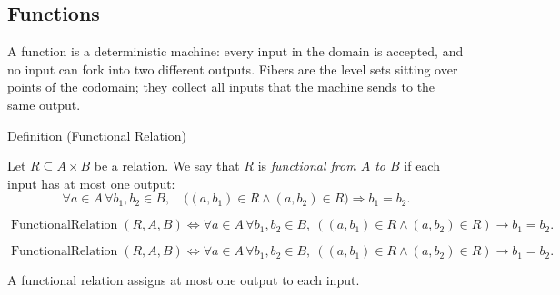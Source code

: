 
\subsection{Functions}


\begin{remark*}[Exposition]
A function is a deterministic machine: every input in the domain is accepted,
and no input can fork into two different outputs. Fibers are the level sets
sitting over points of the codomain; they collect all inputs that the machine
sends to the same output.
\end{remark*}

\begin{definitionbox}{Definition (Functional Relation)}
\begin{definition}\label{def:functional-relation}
Let $R\subseteq A\times B$ be a relation. We say that $R$ is
\emph{functional from $A$ to $B$} if each input has at most one output:
\[
\forall a\in A\,\forall b_1,b_2\in B,\quad
\bigl((a,b_1)\in R\land(a,b_2)\in R\bigr)\Rightarrow b_1=b_2.
\]
\end{definition}
\end{definitionbox}

\begin{remark*}
\[
  \operatorname{FunctionalRelation}(R,A,B)
  \iff
  \forall a\in A\,\forall b_1,b_2\in B,\ 
  ((a,b_1)\in R\wedge(a,b_2)\in R)\to b_1=b_2.
\]
\end{remark*}

\begin{remark*}
\[
  \operatorname{FunctionalRelation}(R,A,B)
  \iff
  \forall a\in A\,\forall b_1,b_2\in B,\ 
  ((a,b_1)\in R\wedge(a,b_2)\in R)\to b_1=b_2.
\]
\end{remark*}

\begin{remark*}[Interpretation]
A functional relation assigns at most one output to each input.
\end{remark*}

